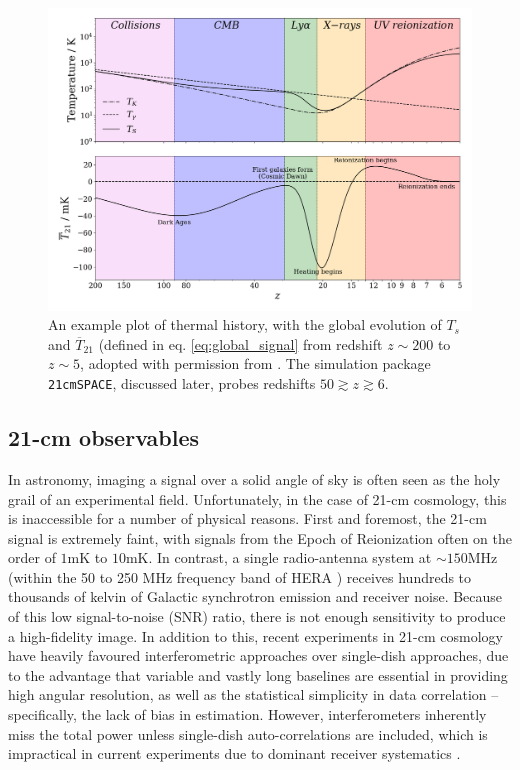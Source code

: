 \documentclass[floats,floatfix,showpacs,amssymb,prd,superscriptaddress,nofootinbib]{revtex4-2} %
\newcommand{\code}{\texttt}
\newcommand{\red}{\textcolor{red}}
\begin{document}
\begin{figure}[H]
    \centering
    \includegraphics[width=0.85\columnwidth]{images/Example21cm.png}
    \caption{An example plot of thermal history, with the global evolution of $T_s$ and $\overline{T}_{21}$ (defined in eq. \ref{eq:global_signal} from redshift $z \sim 200$ to $z \sim 5$, adopted with permission from \citet{dhandha_2022}. The simulation package \code{21cmSPACE}, discussed later, probes redshifts $50 \gtrsim z \gtrsim 6$.}
    \label{fig:example_21cm}
\end{figure}

\subsection{21-cm observables}

In astronomy, imaging a signal over a solid angle of sky is often seen as the holy grail of an experimental field. Unfortunately, in the case of 21-cm cosmology, this is inaccessible for a number of physical reasons. First and foremost, the 21-cm signal is extremely faint, with signals from the Epoch of Reionization often on the order of $1 \text{mK}$ to $10 \text{mK}$.
In contrast, a single radio-antenna system at  $\sim 150 \text{MHz}$ (within the 50 to 250 MHz frequency band of HERA \citep{DeBoer_2017}) receives hundreds to thousands of kelvin of Galactic synchrotron emission and receiver noise. Because of this low signal-to-noise (SNR) ratio, there is not enough sensitivity to produce a high-fidelity image. In addition to this, recent experiments in 21-cm cosmology have heavily favoured interferometric approaches over single-dish approaches, due to the advantage that variable and vastly long baselines are essential in providing high angular resolution, as well as the statistical simplicity in data correlation -- specifically, the lack of bias in estimation. However, interferometers inherently miss the total power unless single-dish auto-correlations are included, which is impractical in current experiments due to dominant receiver systematics \citep{Liu_Shaw_2020}.
\end{document}
